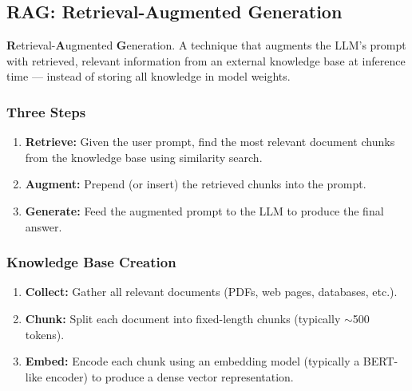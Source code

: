 \documentclass[11pt, a4paper]{article}
\begin{document}
\subsection{RAG: Retrieval-Augmented Generation}

\begin{defbox}
\textbf{R}etrieval-\textbf{A}ugmented \textbf{G}eneration. A technique that augments the LLM's prompt with retrieved, relevant information from an external knowledge base at inference time --- instead of storing all knowledge in model weights.
\end{defbox}

\subsubsection{Three Steps}

\begin{enumerate}[leftmargin=2em]
  \item \textbf{Retrieve:} Given the user prompt, find the most relevant document chunks from the knowledge base using similarity search.
  \item \textbf{Augment:} Prepend (or insert) the retrieved chunks into the prompt.
  \item \textbf{Generate:} Feed the augmented prompt to the LLM to produce the final answer.
\end{enumerate}

\subsubsection{Knowledge Base Creation}

\begin{defbox}
\begin{enumerate}[leftmargin=1.5em]
  \item \textbf{Collect:} Gather all relevant documents (PDFs, web pages, databases, etc.).
  \item \textbf{Chunk:} Split each document into fixed-length chunks (typically $\sim$500 tokens).
  \item \textbf{Embed:} Encode each chunk using an embedding model (typically a BERT-like encoder) to produce a dense vector representation.
\end{enumerate}
\end{defbox}
\end{document}
